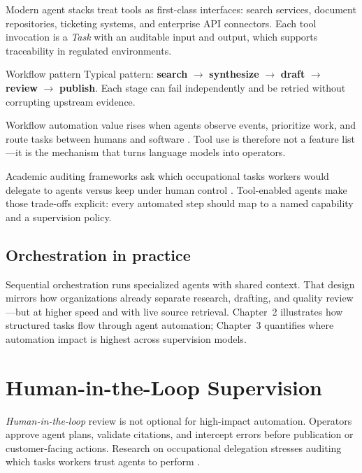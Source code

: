 Modern agent stacks treat tools as first-class interfaces: search services, document
repositories, ticketing systems, and enterprise API connectors. Each tool invocation is a
\emph{Task} with an auditable input and output, which supports traceability in regulated
environments.

\begin{insightbox}{Workflow pattern}
Typical pattern: \textbf{search} $\rightarrow$ \textbf{synthesize} $\rightarrow$
\textbf{draft} $\rightarrow$ \textbf{review} $\rightarrow$ \textbf{publish}. Each stage
can fail independently and be retried without corrupting upstream evidence.
\end{insightbox}

Workflow automation value rises when agents observe events, prioritize work, and route
tasks between humans and software \cite{mediumworkflowagents}. Tool use is therefore not a
feature list---it is the mechanism that turns language models into operators.

Academic auditing frameworks ask which occupational tasks workers would delegate to
agents versus keep under human control \cite{arxiv2506workagents}. Tool-enabled agents make
those trade-offs explicit: every automated step should map to a named capability and a
supervision policy.

\subsection{Orchestration in practice}
Sequential orchestration runs specialized agents with shared context. That design mirrors
how organizations already separate research, drafting, and quality review---but at higher
speed and with live source retrieval. Chapter~2 illustrates how structured tasks flow through
agent automation; Chapter~3 quantifies where automation impact is highest across supervision
models.

\section{Human-in-the-Loop Supervision}
\label{sec:human-in-loop}

\emph{Human-in-the-loop} review is not optional for high-impact automation. Operators
approve agent plans, validate citations, and intercept errors before publication or
customer-facing actions. Research on occupational delegation stresses auditing which tasks
workers trust agents to perform \cite{arxiv2506workagents}.

